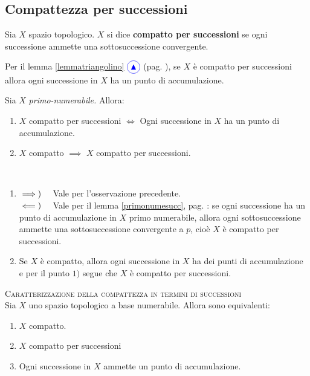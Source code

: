 \subsection{Compattezza per successioni}
\begin{define}
Sia $X$ spazio topologico. $X$ si dice \textbf{compatto per successioni} se ogni successione ammette una sottosuccessione convergente.
\end{define}
\begin{observe}
Per il lemma \ref{lemmatriangolino} $\textcolor{blue}{\circled{{\large \blacktriangle}}}$ (pag. \pageref{lemmatriangolino}), se $X$ è compatto per successioni allora ogni successione in $X$ ha un punto di accumulazione.
\end{observe}
\begin{lemming}
	Sia $X$ \textit{primo-numerabile.} Allora:
\begin{enumerate}
	\item $X$ compatto per successioni $\iff $ Ogni successione in $X$ ha un punto di accumulazione.
	\item $X$ compatto $\implies$ $X$ compatto per successioni.
\end{enumerate}
\end{lemming}
\begin{demonstration}~{}
\begin{enumerate}[label=\Roman*]
\item $\implies)\quad$ Vale per l'osservazione precedente.\\
$\impliedby)\quad$ Vale per il lemma \ref{primonumesucc}, pag. \pageref{primonumesucc}: se ogni successione ha un punto di accumulazione in $X$ primo numerabile, allora ogni sottosuccessione ammette una sottosuccessione convergente a $p$, cioè $X$ è compatto per successioni.
\item Se $X$ è compatto, allora ogni successione in $X$ ha dei punti di accumulazione e per il punto $1)$ segue che $X$ è compatto per successioni.
\end{enumerate}
\end{demonstration}
\begin{proposition}\textsc{Caratterizzazione della compattezza in termini di successioni}\\
	Sia $X$ uno spazio topologico a base numerabile. Allora sono equivalenti:
	\begin{enumerate}
		\item $X$ compatto.
		\item $X$ compatto per successioni
		\item Ogni successione in $X$ ammette un punto di accumulazione.
	\end{enumerate}
\end{proposition}
